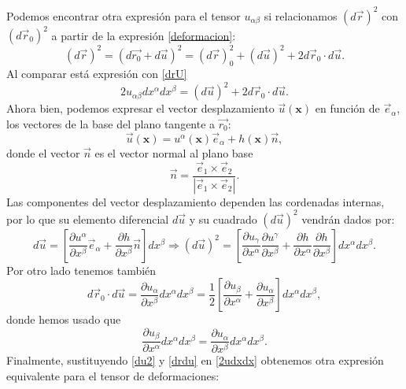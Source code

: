 Podemos encontrar otra expresión para el tensor $u_{\alpha\beta}$ si
relacionamos $(d\vec{r})^2$ con $(d\vec{r}_0)^2$ a partir de
la expresión \eqref{deformacion}:
\begin{equation}\label{dl_vectorial}
(d\vec{r})^2=(d\vec{r_0}+d\vec{u})^2=(d\vec{r})^2_0+(d\vec{u})^2+2d\vec{r}_0\cdot d\vec{u}.
\end{equation}
Al comparar está expresión con \eqref{drU}
\begin{equation}\label{2udxdx}
2u_{\alpha\beta}dx^{\alpha}dx^{\beta}=(d\vec{u})^2+2d\vec{r}_0\cdot d\vec{u}.
\end{equation}
Ahora bien, podemos expresar el vector desplazamiento $\vec{u}(\mathbf{x})$ en función de
$\vec{e}_{\alpha}$, los vectores de la base del plano tangente a $\vec{r_0}$:
\begin{equation*}
  \vec{u}(\mathbf{x})=u^{\alpha}(\mathbf{x})\vec{e}_{\alpha}+h(\mathbf{x})\vec{n},
\end{equation*}
donde el vector $\vec{n}$ es el vector normal al plano base
\begin{equation}
\vec{n}=\frac{\vec{e}_1\times \vec{e}_2}{|\vec{e}_1\times \vec{e}_2|}.
\end{equation}
Las componentes del vector desplazamiento dependen las cordenadas internas, por lo que su elemento
diferencial $d\vec{u}$ y su cuadrado $(d\vec{u})^2$ vendrán dados por: 
\begin{equation}\label{du2}
d\vec{u}=\left[\frac{\partial
  u^{\alpha}}{\partial x^{\beta}}\vec{e}_{\alpha}+\frac{\partial
  h}{\partial x^{\beta}} \vec{n}\right]dx^{\beta}\Rightarrow
(d\vec{u})^2=\left[
\frac{\partial u_{\gamma}}{\partial x^{\alpha}}
\frac{\partial u^{\gamma}}{\partial x^{\beta}}+ 
\frac{\partial h}{\partial x^{\alpha}}
\frac{\partial h}{\partial x^{\beta}}\right]
dx^{\alpha}dx^{\beta}.
\end{equation}
Por otro lado tenemos también
\begin{equation}\label{drdu}
d\vec{r}_0\cdot d\vec{u}=\frac{\partial u_{\alpha}}{\partial x^{\beta}}dx^{\alpha}dx^{\beta}=\frac{1}{2}\left[\frac{\partial u_{\beta}}{\partial x^{\alpha}}+ \frac{\partial u_{\alpha}}{\partial x^{\beta}}\right]dx^{\alpha}dx^{\beta},
\end{equation}
donde hemos usado que
 $$\frac{\partial u_{\beta}}{\partial
   x^{\alpha}}dx^{\alpha}dx^{\beta}=\frac{\partial u_{\alpha}}{\partial
   x^{\beta}}dx^{\alpha}dx^{\beta}.$$
Finalmente, sustituyendo \eqref{du2} y \eqref{drdu} en \eqref{2udxdx}
obtenemos otra expresión equivalente para el tensor de deformaciones:
